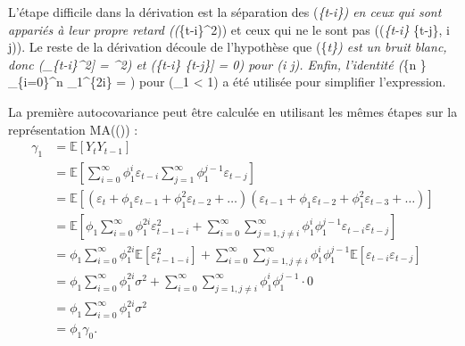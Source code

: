 \documentclass[
  letterpaper,
  DIV=11,
  numbers=noendperiod]{scrartcl}
\begin{document}
L'étape difficile dans la dérivation est la séparation des
(\varepsilon\emph{\{t-i\}) en ceux qui sont appariés à leur propre
retard ((\varepsilon}\{t-i\}\^{}2)) et ceux qui ne le sont pas
((\varepsilon\emph{\{t-i\} \varepsilon}\{t-j\}, i \neq j)). Le reste de
la dérivation découle de l'hypothèse que (\{\varepsilon\emph{t\}) est un
bruit blanc, donc (\mathbb{E}{[}\varepsilon\_\{t-i\}\^{}2{]} =
\sigma\^{}2) et (\mathbb{E}{[}\varepsilon\emph{\{t-i\}
\varepsilon}\{t-j\}{]} = 0) pour (i \neq j). Enfin, l'identité (\lim}\{n
\to \infty\} \sum\_\{i=0\}\^{}n \phi\_1\^{}\{2i\} =
) pour (\textbar{}\phi\_1\textbar{} \textless{} 1)
a été utilisée pour simplifier l'expression.

La première autocovariance peut être calculée en utilisant les mêmes
étapes sur la représentation MA((\infty)) : \[
\begin{aligned}
\gamma_1 &= \mathbb{E}[Y_t Y_{t-1}]  \\
&= \mathbb{E}\left[\sum_{i=0}^{\infty} \phi_1^i \varepsilon_{t-i} \sum_{j=1}^{\infty} \phi_1^{j-1} \varepsilon_{t-j}\right] \\
&= \mathbb{E}\left[(\varepsilon_t + \phi_1 \varepsilon_{t-1} + \phi_1^2 \varepsilon_{t-2} + \dots)(\varepsilon_{t-1} + \phi_1 \varepsilon_{t-2} + \phi_1^2 \varepsilon_{t-3} + \dots)\right] \\
&= \mathbb{E}\left[\phi_1 \sum_{i=0}^{\infty} \phi_1^{2i} \varepsilon_{t-1-i}^2 + \sum_{i=0}^{\infty} \sum_{j=1, j \neq i}^{\infty} \phi_1^i \phi_1^{j-1} \varepsilon_{t-i} \varepsilon_{t-j}\right] \\
&= \phi_1 \sum_{i=0}^{\infty} \phi_1^{2i} \mathbb{E}[\varepsilon_{t-1-i}^2] + \sum_{i=0}^{\infty} \sum_{j=1, j \neq i}^{\infty} \phi_1^i \phi_1^{j-1} \mathbb{E}[\varepsilon_{t-i} \varepsilon_{t-j}] \\
&= \phi_1 \sum_{i=0}^{\infty} \phi_1^{2i} \sigma^2 + \sum_{i=0}^{\infty} \sum_{j=1, j \neq i}^{\infty} \phi_1^i \phi_1^{j-1} \cdot 0 \\
&= \phi_1 \sum_{i=0}^{\infty} \phi_1^{2i} \sigma^2 \\
&= \phi_1 \gamma_0.
\end{aligned}
\]
\end{document}
